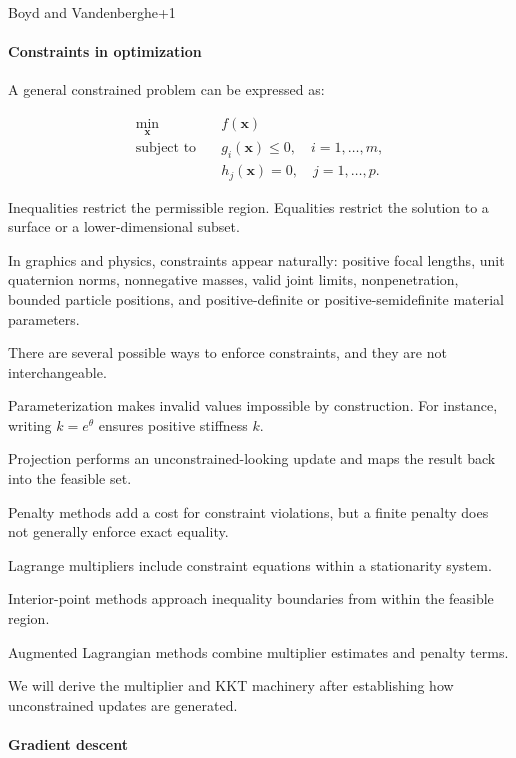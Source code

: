 Boyd and Vandenberghe+1

\paragraph{Constraints in optimization}\label{constraints-in-optimization}

A general constrained problem can be expressed as:

\[
\begin{aligned} \min_{\mathbf x}\quad &f(\mathbf x)\\ \text{subject to}\quad &g_i(\mathbf x)\le0,\quad i=1,\ldots,m,\\ &h_j(\mathbf x)=0,\quad j=1,\ldots,p. \end{aligned}
\]

Inequalities restrict the permissible region. Equalities restrict the solution to a surface or a lower-dimensional subset.

In graphics and physics, constraints appear naturally: positive focal lengths, unit quaternion norms, nonnegative masses, valid joint limits, nonpenetration, bounded particle positions, and positive-definite or positive-semidefinite material parameters.

There are several possible ways to enforce constraints, and they are not interchangeable.

Parameterization makes invalid values impossible by construction. For instance, writing \(k=e^\theta\) ensures positive stiffness \(k\).

Projection performs an unconstrained-looking update and maps the result back into the feasible set.

Penalty methods add a cost for constraint violations, but a finite penalty does not generally enforce exact equality.

Lagrange multipliers include constraint equations within a stationarity system.

Interior-point methods approach inequality boundaries from within the feasible region.

Augmented Lagrangian methods combine multiplier estimates and penalty terms.

We will derive the multiplier and KKT machinery after establishing how unconstrained updates are generated.

\paragraph{Gradient descent}\label{gradient-descent}

